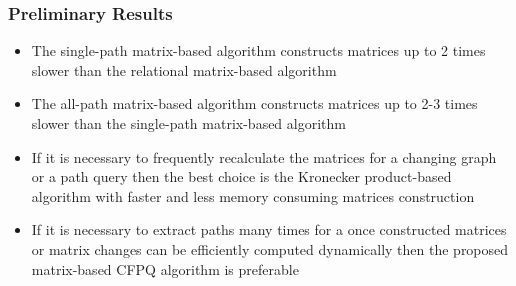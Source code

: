 \documentclass[xcolor=table,aspectratio=169]{beamer}
\begin{document}
\begin{frame}[fragile] \frametitle{Preliminary Results}
	\begin{itemize} 
		\item The single-path matrix-based algorithm constructs matrices up to 2 times slower than the relational matrix-based algorithm
		\item The all-path matrix-based algorithm constructs matrices up to 2-3 times slower than the single-path matrix-based algorithm
		\pause
		\item If it is necessary to frequently recalculate
		the matrices for a changing graph or a path query then the best
		choice is the Kronecker product-based algorithm with
		faster and less memory consuming matrices construction
		\pause
		\item If it is  necessary to extract paths many times for a once constructed
		matrices or matrix changes can be efficiently computed dynamically then the proposed matrix-based CFPQ algorithm is  preferable
	\end{itemize}
	
	
\end{frame}
\end{document}
